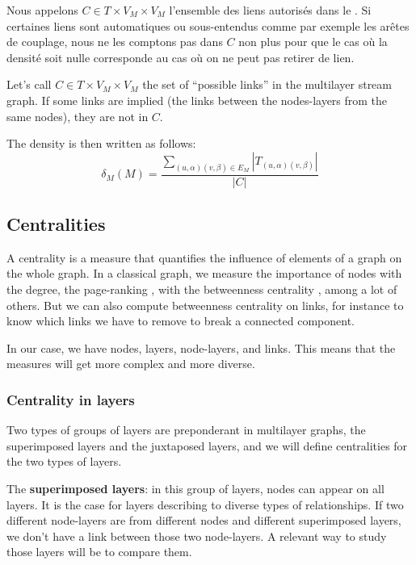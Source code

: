 \documentclass{svproc}
\begin{document}
\begin{definition}	
	Nous appelons  $C \in T \times V_M\times V_M$ l'ensemble des liens autorisés dans le \stgm{}. Si certaines liens sont \og automatiques\fg{} ou \og sous-entendus \fg{} comme par exemple les arêtes de couplage, nous ne les comptons pas dans $C$ non plus pour que le cas où la densité soit nulle corresponde au cas où on ne peut pas retirer de lien.

	Let's call $C \in T \times V_M\times V_M$ the set of ``possible links'' in the multilayer stream graph. If some links are implied (the links between the nodes-layers from the same nodes), they are not in $C$. 
	
	The density is then written as follows:
	\[
		\delta_M (M) 
		= \frac{\sum_{(u,\alpha)(v,\beta) \in E_M}|T_{(u,\alpha)(v,\beta)}|}{|C|}
	\]
\end{definition}	
	


\subsection{Centralities}
%
A centrality is a measure that quantifies the influence of elements of a graph on the whole graph. In a classical graph, we measure the importance of nodes with the degree, the page-ranking \cite{pr}, with the betweenness centrality \cite{btw}, among a lot of others. But we can also compute betweenness centrality on links, for instance to know which links we have to remove to break a connected component.

In our case, we have nodes, layers, node-layers, and links. This means that the measures will get more complex and more diverse.

\subsubsection{Centrality in layers}

Two types of groups of layers are preponderant in multilayer graphs, the superimposed layers and the juxtaposed layers, and we will define centralities for the two types of layers.

The {\bf superimposed layers}: in this group of layers, nodes can appear on all layers. It is the case for layers describing to diverse types of relationships. If two different node-layers are from different nodes and different superimposed layers, we don't have a link between those two node-layers. A relevant way to study those layers will be to compare them.
\end{document}
